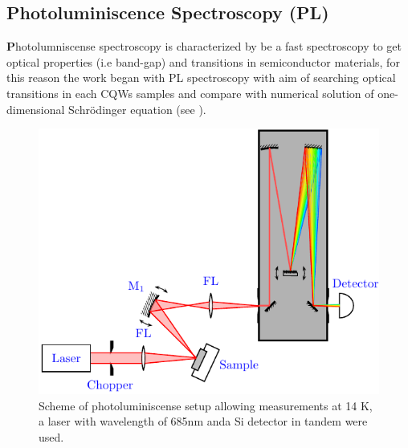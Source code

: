 \subsection{Photoluminiscence Spectroscopy (PL)}
\label{subsec:chapter-3-pl}
\vspace{-10mm}
\lettrine[lines=3, lraise=.1, nindent=0mm, slope=0mm]{\textbf{P}}{}hotolumniscense spectroscopy is characterized by be a fast spectroscopy to get optical properties (i.e band-gap) and transitions in  semiconductor materials, for this reason the work began with PL spectroscopy with aim of searching optical transitions in each CQWs samples and compare with  numerical solution of one-dimensional Schr\"odinger equation (see ). 
\begin{figure}
	\centering
	\includegraphics[width=\textwidth]{../figures/chapter-3/pl-setup/build-ruco/pl-setup}
	\caption[PL Scheme]{Scheme of photoluminiscense setup allowing measurements at 14 K, a laser with wavelength of 685nm anda Si detector in tandem were used.}
	\label{fig:chapter-3 subsec 3.2.1 PL setup}
\end{figure}
 
